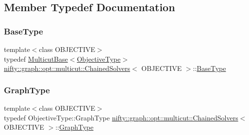 \subsection{Member Typedef Documentation}
\mbox{\label{classnifty_1_1graph_1_1opt_1_1multicut_1_1ChainedSolvers_a77e11f6353ef773b9570eb302158bc12}} 
\subsubsection{\texorpdfstring{Base\+Type}{BaseType}}
{\footnotesize\ttfamily template$<$class O\+B\+J\+E\+C\+T\+I\+VE$>$ \\
typedef \hyperlink{classnifty_1_1graph_1_1opt_1_1multicut_1_1MulticutBase}{Multicut\+Base}$<$\hyperlink{classnifty_1_1graph_1_1opt_1_1multicut_1_1ChainedSolvers_a4d9fa96d1a27a875c036b01bf547c1d0}{Objective\+Type}$>$ \hyperlink{classnifty_1_1graph_1_1opt_1_1multicut_1_1ChainedSolvers}{nifty\+::graph\+::opt\+::multicut\+::\+Chained\+Solvers}$<$ O\+B\+J\+E\+C\+T\+I\+VE $>$\+::\hyperlink{classnifty_1_1graph_1_1opt_1_1multicut_1_1ChainedSolvers_a77e11f6353ef773b9570eb302158bc12}{Base\+Type}}

\mbox{\label{classnifty_1_1graph_1_1opt_1_1multicut_1_1ChainedSolvers_aed99a8b8eb707145f933b36e3a71ad8b}} 
\subsubsection{\texorpdfstring{Graph\+Type}{GraphType}}
{\footnotesize\ttfamily template$<$class O\+B\+J\+E\+C\+T\+I\+VE$>$ \\
typedef Objective\+Type\+::\+Graph\+Type \hyperlink{classnifty_1_1graph_1_1opt_1_1multicut_1_1ChainedSolvers}{nifty\+::graph\+::opt\+::multicut\+::\+Chained\+Solvers}$<$ O\+B\+J\+E\+C\+T\+I\+VE $>$\+::\hyperlink{classnifty_1_1graph_1_1opt_1_1multicut_1_1ChainedSolvers_aed99a8b8eb707145f933b36e3a71ad8b}{Graph\+Type}}

